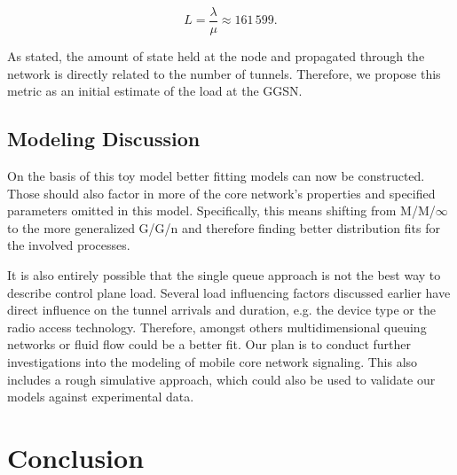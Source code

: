 $$
L=\frac{\lambda}{\mu}\approx 161\,599. %
$$

As stated, the amount of state held at the node and propagated through the network is directly related to the number of tunnels. Therefore, we propose this metric as an initial estimate of the load at the \ac{GGSN}. 


\subsection{Modeling Discussion}

On the basis of this toy model better fitting models can now be constructed. Those should also factor in more of the core network's properties and specified parameters omitted in this model. Specifically, this means shifting from M/M/$\infty$ to the more generalized G/G/n and therefore finding better distribution fits for the involved processes.

It is also entirely possible that the single queue approach is not the best way to describe control plane load. Several load influencing factors discussed earlier have direct influence on the tunnel arrivals and duration, e.g. the device type or the radio access technology. Therefore, amongst others multidimensional queuing networks or fluid flow could be a better fit. Our plan is to conduct further investigations into the modeling of mobile core network signaling. This also includes a rough simulative approach, which could also be used to validate our models against experimental data.








\section{Conclusion}
\label{sec:conclusion-IMC}
\acresetall

